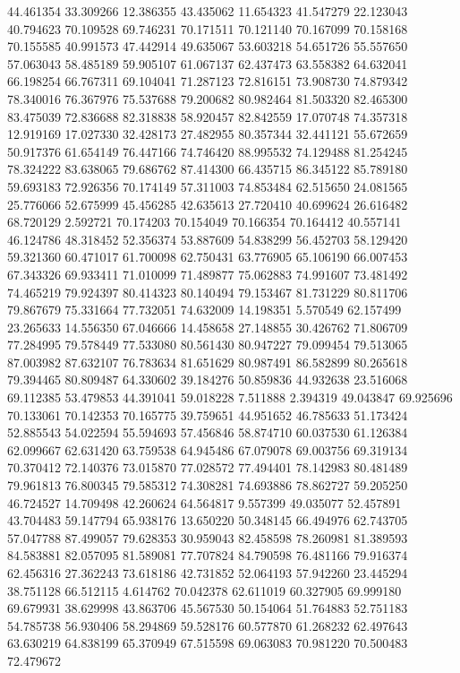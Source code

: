 44.461354
33.309266
12.386355
43.435062
11.654323
41.547279
22.123043
40.794623
70.109528
69.746231
70.171511
70.121140
70.167099
70.158168
70.155585
40.991573
47.442914
49.635067
53.603218
54.651726
55.557650
57.063043
58.485189
59.905107
61.067137
62.437473
63.558382
64.632041
66.198254
66.767311
69.104041
71.287123
72.816151
73.908730
74.879342
78.340016
76.367976
75.537688
79.200682
80.982464
81.503320
82.465300
83.475039
72.836688
82.318838
58.920457
82.842559
17.070748
74.357318
12.919169
17.027330
32.428173
27.482955
80.357344
32.441121
55.672659
50.917376
61.654149
76.447166
74.746420
88.995532
74.129488
81.254245
78.324222
83.638065
79.686762
87.414300
66.435715
86.345122
85.789180
59.693183
72.926356
70.174149
57.311003
74.853484
62.515650
24.081565
25.776066
52.675999
45.456285
42.635613
27.720410
40.699624
26.616482
68.720129
2.592721
70.174203
70.154049
70.166354
70.164412
40.557141
46.124786
48.318452
52.356374
53.887609
54.838299
56.452703
58.129420
59.321360
60.471017
61.700098
62.750431
63.776905
65.106190
66.007453
67.343326
69.933411
71.010099
71.489877
75.062883
74.991607
73.481492
74.465219
79.924397
80.414323
80.140494
79.153467
81.731229
80.811706
79.867679
75.331664
77.732051
74.632009
14.198351
5.570549
62.157499
23.265633
14.556350
67.046666
14.458658
27.148855
30.426762
71.806709
77.284995
79.578449
77.533080
80.561430
80.947227
79.099454
79.513065
87.003982
87.632107
76.783634
81.651629
80.987491
86.582899
80.265618
79.394465
80.809487
64.330602
39.184276
50.859836
44.932638
23.516068
69.112385
53.479853
44.391041
59.018228
7.511888
2.394319
49.043847
69.925696
70.133061
70.142353
70.165775
39.759651
44.951652
46.785633
51.173424
52.885543
54.022594
55.594693
57.456846
58.874710
60.037530
61.126384
62.099667
62.631420
63.759538
64.945486
67.079078
69.003756
69.319134
70.370412
72.140376
73.015870
77.028572
77.494401
78.142983
80.481489
79.961813
76.800345
79.585312
74.308281
74.693886
78.862727
59.205250
46.724527
14.709498
42.260624
64.564817
9.557399
49.035077
52.457891
43.704483
59.147794
65.938176
13.650220
50.348145
66.494976
62.743705
57.047788
87.499057
79.628353
30.959043
82.458598
78.260981
81.389593
84.583881
82.057095
81.589081
77.707824
84.790598
76.481166
79.916374
62.456316
27.362243
73.618186
42.731852
52.064193
57.942260
23.445294
38.751128
66.512115
4.614762
70.042378
62.611019
60.327905
69.999180
69.679931
38.629998
43.863706
45.567530
50.154064
51.764883
52.751183
54.785738
56.930406
58.294869
59.528176
60.577870
61.268232
62.497643
63.630219
64.838199
65.370949
67.515598
69.063083
70.981220
70.500483
72.479672
